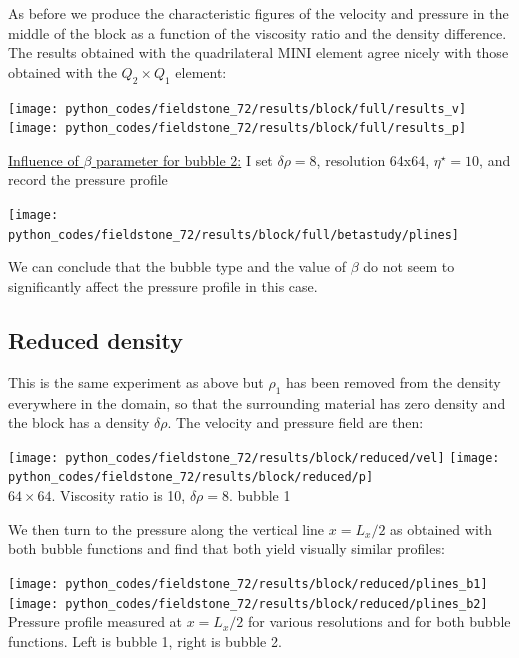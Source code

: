 As before we produce the characteristic figures of the velocity and pressure in the middle of the 
block as a function of the viscosity ratio and the density difference. The results obtained 
with the quadrilateral MINI element agree nicely with those obtained with the $Q_2\times Q_1$ element:
 
\begin{center}
\texttt{[image: python\_codes/fieldstone\_72/results/block/full/results\_v]}
\texttt{[image: python\_codes/fieldstone\_72/results/block/full/results\_p]}
\end{center}


\underline{Influence of $\beta$ parameter for bubble 2:} I set $\delta\rho=8$, resolution 64x64, $\eta^\star=10$,
and record the pressure profile 

\begin{center}
\texttt{[image: python\_codes/fieldstone\_72/results/block/full/betastudy/plines]}
\end{center}

We can conclude that the bubble type and the value of $\beta$ do not seem to significantly affect 
the pressure profile in this case.

\subsection*{Reduced density} 
This is the same experiment as above but $\rho_1$ has been removed from the density
everywhere in the domain, so that the surrounding material has zero density 
and the block has a density $\delta \rho$.
The velocity and pressure field are then:

\begin{center}
\texttt{[image: python\_codes/fieldstone\_72/results/block/reduced/vel]}
\texttt{[image: python\_codes/fieldstone\_72/results/block/reduced/p]}\\
{\captionfont $64\times 64$. Viscosity ratio is 10, $\delta \rho=8$. bubble 1}
\end{center}

We then turn to the pressure along the vertical line $x=L_x/2$ as obtained with 
both bubble functions and find that both yield visually similar profiles:

\begin{center}
\texttt{[image: python\_codes/fieldstone\_72/results/block/reduced/plines\_b1]}
\texttt{[image: python\_codes/fieldstone\_72/results/block/reduced/plines\_b2]}\\
{\captionfont Pressure profile measured at $x=L_x/2$ for various resolutions and for both bubble functions.
Left is bubble 1, right is bubble 2.}
\end{center}

